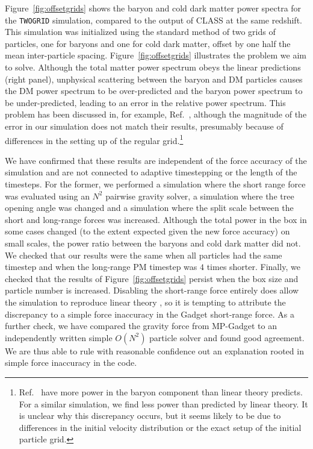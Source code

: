 \documentclass[a4paper,11pt]{article}
\begin{document}
Figure~\ref{fig:offsetgrids} shows the baryon and cold dark matter power spectra for the \texttt{TWOGRID} simulation, compared to the output of CLASS at the same redshift. This simulation was initialized using the standard method of two grids of particles, one for baryons and one for cold dark matter, offset by one half the mean inter-particle spacing. Figure~\ref{fig:offsetgrids} illustrates the problem we aim to solve. Although the total matter power spectrum obeys the linear predictions (right panel), unphysical scattering between the baryon and DM particles causes the DM power spectrum to be over-predicted and the baryon power spectrum to be under-predicted, leading to an error in the relative power spectrum. This problem has been discussed in, for example, Ref.~\cite{Angulo:2013}, although the magnitude of the error in our simulation does not match their results, presumably because of differences in the setting up of the regular grid.\footnote{Ref.~\cite{Angulo:2013} have more power in the baryon component than linear theory predicts. For a similar simulation, we find less power than predicted by linear theory. It is unclear why this discrepancy occurs, but it seems likely to be due to differences in the initial velocity distribution or the exact setup of the initial particle grid.}

We have confirmed that these results are independent of the force accuracy of the simulation and are not connected to adaptive timestepping or the length of the timesteps. For the former, we performed a simulation where the short range force was evaluated using an $N^2$ pairwise gravity solver, a simulation where the tree opening angle was changed and a simulation where the split scale between the short and long-range forces was increased. Although the total power in the box in some cases changed (to the extent expected given the new force accuracy) on small scales, the power ratio between the baryons and cold dark matter did not. We checked that our results were the same when all particles had the same timestep and when the long-range PM timestep was $4$ times shorter. Finally, we checked that the results of Figure~\ref{fig:offsetgrids} persist when the box size and particle number is increased. Disabling the short-range force entirely does allow the simulation to reproduce linear theory \cite{Angulo:2013}, so it is tempting to attribute the discrepancy to a simple force inaccuracy in the Gadget short-range force. As a further check, we have compared the gravity force from MP-Gadget to an independently written simple $O(N^2)$ particle solver and found good agreement. We are thus able to rule with reasonable confidence out an explanation rooted in simple force inaccuracy in the code.
\end{document}
